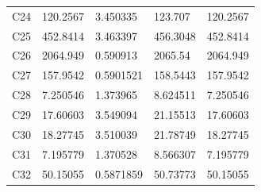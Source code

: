 \documentclass[
  american,
  11pt,
]{article}
\begin{document}
{\begin{longtable}[]{@{}lllll@{}}
C24 & 120.2567 & 3.450335 & 123.707 & 120.2567 \\
C25 & 452.8414 & 3.463397 & 456.3048 & 452.8414 \\
C26 & 2064.949 & 0.590913 & 2065.54 & 2064.949 \\
C27 & 157.9542 & 0.5901521 & 158.5443 & 157.9542 \\
C28 & 7.250546 & 1.373965 & 8.624511 & 7.250546 \\
C29 & 17.60603 & 3.549094 & 21.15513 & 17.60603 \\
C30 & 18.27745 & 3.510039 & 21.78749 & 18.27745 \\
C31 & 7.195779 & 1.370528 & 8.566307 & 7.195779 \\
C32 & 50.15055 & 0.5871859 & 50.73773 & 50.15055 \\
\end{longtable}
}
\end{document}

